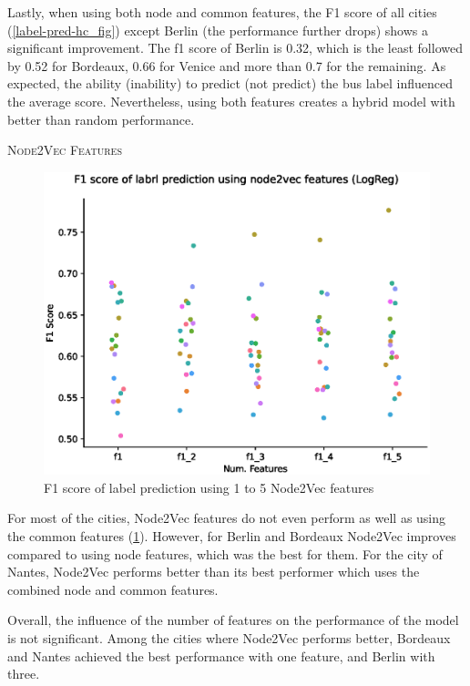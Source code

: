 \documentclass{article}
\theoremstyle{plain}
\theoremstyle{definition}
\theoremstyle{remark}
\begin{document}
Lastly, when using both node and common features, the F1 score of all cities (\cref{label-pred-hc_fig}) except Berlin (the performance further drops) shows a significant improvement. The f1 score of Berlin is 0.32, which is the least followed by 0.52 for Bordeaux, 0.66 for Venice and more than 0.7 for the remaining. As expected, the ability (inability) to predict (not predict) the bus label influenced the average score. Nevertheless, using both features creates a hybrid model with better than random performance.

\textsc{Node2Vec Features}

\begin{figure}[ht]
\vskip -0.1in
\begin{center}
\centerline{\includegraphics[width=\columnwidth]{images/label-pred-node2vec.eps}}
\caption{F1 score of label prediction using 1 to 5 Node2Vec features}
\label{label-pred-n2v_fig}
\end{center}
\vskip -0.3in
\end{figure}

For most of the cities, Node2Vec features do not even perform as well as using the common features (\cref{label-pred-n2v_fig}). However, for Berlin and Bordeaux Node2Vec improves compared to using node features, which was the best for them. For the city of Nantes, Node2Vec performs better than its best performer which uses the combined node and common features. 

Overall, the influence of the number of features on the performance of the model is not significant. Among the cities where Node2Vec performs better, Bordeaux and Nantes achieved the best performance with one feature, and Berlin with three.
\end{document}

